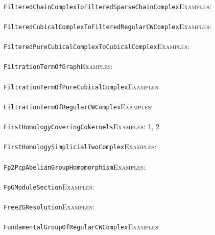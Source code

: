\documentclass[a4paper,11pt]{report}
\begin{document}
{{ \\
 \texttt{FilteredChainComplexToFilteredSparseChainComplex}{\nobreakspace}{\nobreakspace}{\nobreakspace}{\nobreakspace}\textsc{Examples:} \\
 \\
 \texttt{FilteredCubicalComplexToFilteredRegularCWComplex}{\nobreakspace}{\nobreakspace}{\nobreakspace}{\nobreakspace}\textsc{Examples:} \\
 \\
 \texttt{FilteredPureCubicalComplexToCubicalComplex}{\nobreakspace}{\nobreakspace}{\nobreakspace}{\nobreakspace}\textsc{Examples:} \\
 \\
 \texttt{FiltrationTermOfGraph}{\nobreakspace}{\nobreakspace}{\nobreakspace}{\nobreakspace}\textsc{Examples:} \\
 \\
 \texttt{FiltrationTermOfPureCubicalComplex}{\nobreakspace}{\nobreakspace}{\nobreakspace}{\nobreakspace}\textsc{Examples:} \\
 \\
 \texttt{FiltrationTermOfRegularCWComplex}{\nobreakspace}{\nobreakspace}{\nobreakspace}{\nobreakspace}\textsc{Examples:} \\
 \\
 \texttt{FirstHomologyCoveringCokernels}{\nobreakspace}{\nobreakspace}{\nobreakspace}{\nobreakspace}\textsc{Examples:} \href{tutorial/chap3.html} {1}{\nobreakspace}, \href{../www/SideLinks/About/aboutCoverinSpaces.html} {2}{\nobreakspace} \\
 \\
 \texttt{FirstHomologySimplicialTwoComplex}{\nobreakspace}{\nobreakspace}{\nobreakspace}{\nobreakspace}\textsc{Examples:} \\
 \\
 \texttt{Fp2PcpAbelianGroupHomomorphism}{\nobreakspace}{\nobreakspace}{\nobreakspace}{\nobreakspace}\textsc{Examples:} \\
 \\
 \texttt{FpGModuleSection}{\nobreakspace}{\nobreakspace}{\nobreakspace}{\nobreakspace}\textsc{Examples:} \\
 \\
 \texttt{FreeZGResolution}{\nobreakspace}{\nobreakspace}{\nobreakspace}{\nobreakspace}\textsc{Examples:} \\
 \\
 \texttt{FundamentalGroupOfRegularCWComplex}{\nobreakspace}{\nobreakspace}{\nobreakspace}{\nobreakspace}\textsc{Examples:} \\
}}
\end{document}
